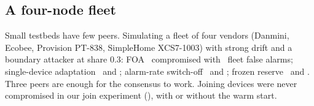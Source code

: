 \subsection{A four-node fleet}
Small testbeds have few peers. Simulating a fleet of four vendors (Danmini, Ecobee, Provision PT-838,
SimpleHome XCS7-1003) with strong drift and a boundary attacker at share 0.3: FOA \FourCompFOA\
compromised with \FourFPRFOA\ fleet false alarms; single-device adaptation \FourCompAuto\ and
\FourFPRAuto; alarm-rate switch-off \FourCompKL\ and \FourFPRKL; frozen reserve \FourCompFrozen\ and
\FourFPRFrozen. Three peers are enough for the consensus to work. Joining devices were never
compromised in our join experiment (\JoinComp), with or without the warm start.


